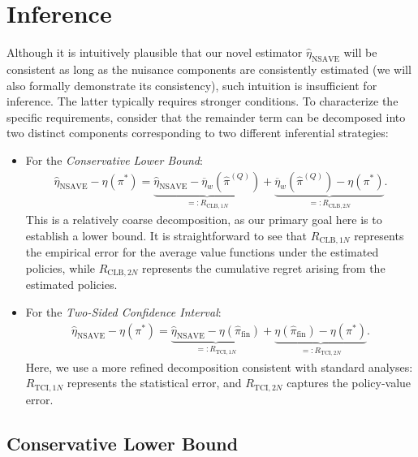 \documentclass[12pt]{article}
\theoremstyle{remark}\newtheorem{remark}[theorem]{Remark}\theoremstyle{plain}
\begin{document}
\section{Inference}\label{sec:inference}

Although it is intuitively plausible that our novel estimator $\widehat{\eta}_{\text{NSAVE}}$ will be consistent as long as the nuisance components are consistently estimated (we will also formally demonstrate its consistency),
such intuition is insufficient for inference. 
The latter typically requires stronger conditions. To characterize the specific requirements, consider that the remainder term can be decomposed into two distinct components corresponding to two different inferential strategies:

\begin{itemize}
    \item For the \textit{Conservative Lower Bound}: 
    \[
        \begin{aligned}
            \widehat{\eta}_{\text{NSAVE}} - \eta(\pi^*) = \underbrace{\widehat{\eta}_{\text{NSAVE}} - \overline{\eta}_w(\widehat{\pi}^{(Q)})}_{=: R_{\text{CLB}, 1N}} + \underbrace{\overline{\eta}_w(\widehat{\pi}^{(Q)}) - \eta(\pi^*)}_{=: R_{\text{CLB}, 2N}}.
        \end{aligned}
    \]
    This is a relatively coarse decomposition, as our primary goal here is to establish a lower bound. It is straightforward to see that $R_{\text{CLB}, 1N}$ represents the empirical error for the average value functions under the estimated policies, while $R_{\text{CLB}, 2N}$ represents the cumulative regret arising from the estimated policies.

    \item For the \textit{Two-Sided Confidence Interval}:
    \[
        \begin{aligned}
            \widehat{\eta}_{\text{NSAVE}}-\eta(\pi^*)
            =
            \underbrace{\widehat{\eta}_{\text{NSAVE}}
            -\eta(\widehat\pi_{\mathrm{fin}})}
            _{=:R_{\text{TCI},1N}}
            +
            \underbrace{\eta(\widehat\pi_{\mathrm{fin}})
            -\eta(\pi^*)}_{=:R_{\text{TCI},2N}}.
        \end{aligned}
    \]
    Here, we use a more refined decomposition consistent with standard analyses:  $R_{\text{TCI}, 1N}$ represents the statistical error, and $R_{\text{TCI}, 2N}$ captures the policy-value error. 
\end{itemize}


\subsection{Conservative Lower Bound}\label{sec:lower_bound}
\end{document}
